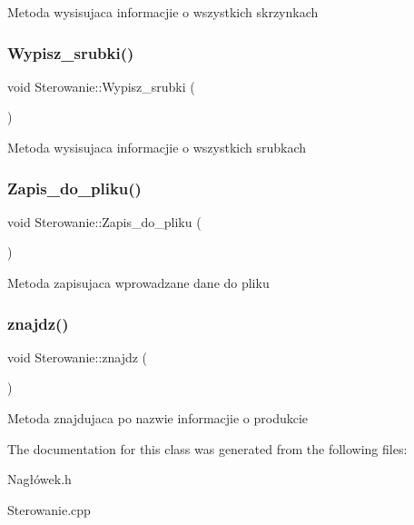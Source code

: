 Metoda wysisujaca informacjie o wszystkich skrzynkach \mbox{\label{class_sterowanie_a2cfe2301e3be2dca7eafb8619a35adb6}} 
\subsubsection{\texorpdfstring{Wypisz\+\_\+srubki()}{Wypisz\_srubki()}}
{\footnotesize\ttfamily void Sterowanie\+::\+Wypisz\+\_\+srubki (\begin{DoxyParamCaption}{ }\end{DoxyParamCaption})}

Metoda wysisujaca informacjie o wszystkich srubkach \mbox{\label{class_sterowanie_aa2c9acc434f34354fe40243b53c295ee}} 
\subsubsection{\texorpdfstring{Zapis\+\_\+do\+\_\+pliku()}{Zapis\_do\_pliku()}}
{\footnotesize\ttfamily void Sterowanie\+::\+Zapis\+\_\+do\+\_\+pliku (\begin{DoxyParamCaption}{ }\end{DoxyParamCaption})}

Metoda zapisujaca wprowadzane dane do pliku \mbox{\label{class_sterowanie_a632b8bffe5b03b03564cf3e1aa02dba1}} 
\subsubsection{\texorpdfstring{znajdz()}{znajdz()}}
{\footnotesize\ttfamily void Sterowanie\+::znajdz (\begin{DoxyParamCaption}{ }\end{DoxyParamCaption})}

Metoda znajdujaca po nazwie informacjie o produkcie 

The documentation for this class was generated from the following files\+:\begin{DoxyCompactItemize}
\item 
Nagłówek.\+h\item 
Sterowanie.\+cpp\end{DoxyCompactItemize}
